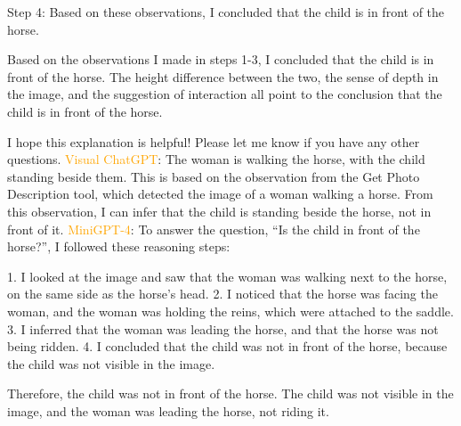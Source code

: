 \begin{enumerate}
        Step 4: Based on these observations, I concluded that the child is in front of the horse.
        
        Based on the observations I made in steps 1-3, I concluded that the child is in front of the horse. The height difference between the two, the sense of depth in the image, and the suggestion of interaction all point to the conclusion that the child is in front of the horse.
        
        I hope this explanation is helpful! Please let me know if you have any other questions.
        \subitem \textcolor{orange}{Visual ChatGPT}: The woman is walking the horse, with the child standing beside them. This is based on the observation from the Get Photo Description tool, which detected the image of a woman walking a horse. From this observation, I can infer that the child is standing beside the horse, not in front of it.
        \subitem \textcolor{orange}{MiniGPT-4}: To answer the question, “Is the child in front of the horse?”, I followed these reasoning steps:

        1. I looked at the image and saw that the woman was walking next to the horse, on the same side as the horse’s head.
        2. I noticed that the horse was facing the woman, and the woman was holding the reins, which were attached to the saddle.
        3. I inferred that the woman was leading the horse, and that the horse was not being ridden.
        4. I concluded that the child was not in front of the horse, because the child was not visible in the image.
        
        Therefore, the child was not in front of the horse. The child was not visible in the image, and the woman was leading the horse, not riding it.
    \end{enumerate}

